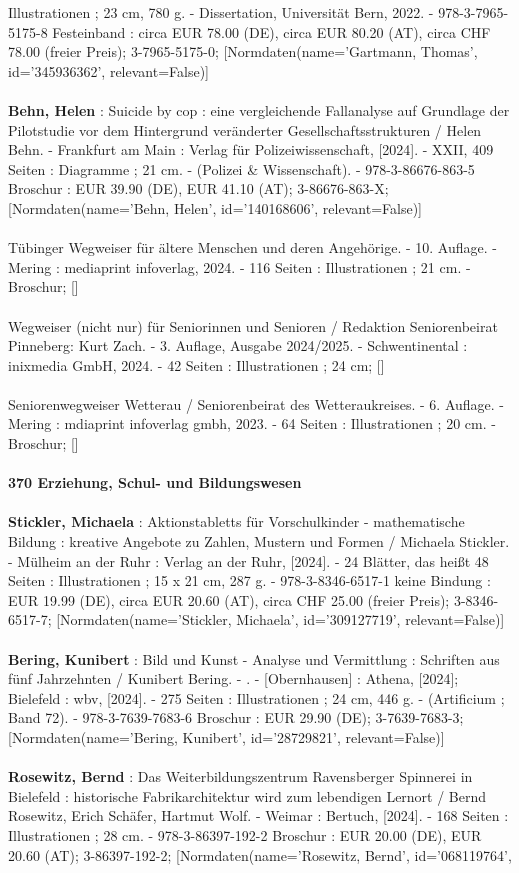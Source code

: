 \documentclass{article}
\begin{document}
\begin{multicols}{3}
Illustrationen ; 23 cm, 780 g. - Dissertation, Universität Bern, 2022. - 978-3-7965-5175-8 Festeinband : circa EUR 78.00 (DE), circa EUR 80.20 (AT), circa CHF 78.00 (freier Preis); 3-7965-5175-0; [Normdaten(name='Gartmann, Thomas', id='345936362', relevant=False)]\\\\\textbf{Behn, Helen} : Suicide by cop : eine vergleichende Fallanalyse auf Grundlage der Pilotstudie vor dem Hintergrund veränderter Gesellschaftsstrukturen / Helen Behn. - Frankfurt am Main : Verlag für Polizeiwissenschaft, [2024]. - XXII, 409 Seiten : Diagramme ; 21 cm. - (Polizei \& Wissenschaft). - 978-3-86676-863-5 Broschur : EUR 39.90 (DE), EUR 41.10 (AT); 3-86676-863-X; [Normdaten(name='Behn, Helen', id='140168606', relevant=False)]\\\\Tübinger Wegweiser für ältere Menschen und deren Angehörige. - 10. Auflage. - Mering : mediaprint infoverlag, 2024. - 116 Seiten : Illustrationen ; 21 cm. - Broschur; []\\\\Wegweiser (nicht nur) für Seniorinnen und Senioren / Redaktion Seniorenbeirat Pinneberg: Kurt Zach. - 3. Auflage, Ausgabe 2024/2025. - Schwentinental : inixmedia GmbH, 2024. - 42 Seiten : Illustrationen ; 24 cm; []\\\\Seniorenwegweiser Wetterau / Seniorenbeirat des Wetteraukreises. - 6. Auflage. - Mering : mdiaprint infoverlag gmbh, 2023. - 64 Seiten : Illustrationen ; 20 cm. - Broschur; []\\\\\textbf{370 Erziehung, Schul- und Bildungswesen}\\\\\textbf{Stickler, Michaela} : Aktionstabletts für Vorschulkinder - mathematische Bildung : kreative Angebote zu Zahlen, Mustern und Formen / Michaela Stickler. - Mülheim an der Ruhr : Verlag an der Ruhr, [2024]. - 24 Blätter, das heißt 48 Seiten : Illustrationen ; 15 x 21 cm, 287 g. - 978-3-8346-6517-1 keine Bindung : EUR 19.99 (DE), circa EUR 20.60 (AT), circa CHF 25.00 (freier Preis); 3-8346-6517-7; [Normdaten(name='Stickler, Michaela', id='309127719', relevant=False)]\\\\\textbf{Bering, Kunibert} : Bild und Kunst - Analyse und Vermittlung : Schriften aus fünf Jahrzehnten / Kunibert Bering. - . - [Obernhausen] : Athena, [2024]; Bielefeld : wbv, [2024]. - 275 Seiten : Illustrationen ; 24 cm, 446 g. - (Artificium ; Band 72). - 978-3-7639-7683-6 Broschur : EUR 29.90 (DE); 3-7639-7683-3; [Normdaten(name='Bering, Kunibert', id='28729821', relevant=False)]\\\\\textbf{Rosewitz, Bernd} : Das Weiterbildungszentrum Ravensberger Spinnerei in Bielefeld : historische Fabrikarchitektur wird zum lebendigen Lernort / Bernd Rosewitz, Erich Schäfer, Hartmut Wolf. - Weimar : Bertuch, [2024]. - 168 Seiten : Illustrationen ; 28 cm. - 978-3-86397-192-2 Broschur : EUR 20.00 (DE), EUR 20.60 (AT); 3-86397-192-2; [Normdaten(name='Rosewitz, Bernd', id='068119764', 
\end{multicols}
\end{document}
